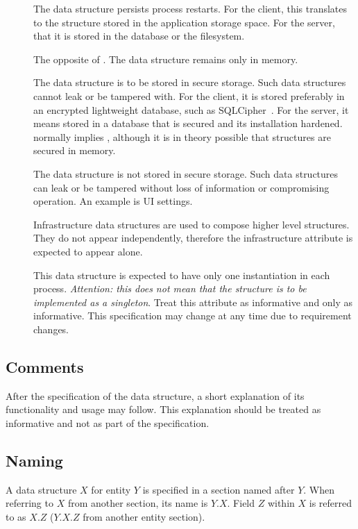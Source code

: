 \documentclass[a4paper,10pt]{article}
\begin{document}
\begin{description}
 \item[\persistent] The data structure persists process restarts. For the client, this translates to the structure stored in the application storage space. For the server, that it 
is stored in the database or the filesystem.
 \item[\ephemeral] The opposite of \persistent. The data structure remains only in memory.
 \item[\secure] The data structure is to be stored in secure storage. Such data structures cannot leak or be tampered with. For the client, it is stored preferably in an encrypted 
lightweight database, such as SQLCipher~\cite{sql_cipher}. For the server, it means stored in a database that is secured and its installation hardened. \secure{} normally implies 
\persistent, although it is in theory possible that \ephemeral{} structures are secured in memory.
 \item[\unsecure] The data structure is not stored in secure storage. Such data structures can leak or be tampered without loss of information or compromising operation. An example 
is UI settings.
 \item[\infrastructure] Infrastructure data structures are used to compose higher level structures. They do not appear independently, therefore the infrastructure attribute is 
expected to appear alone.
 \item[\unique] This data structure is expected to have only one instantiation in each process. {\em Attention: this does not mean that the structure is to be implemented as a 
singleton}. Treat this attribute as informative and only as informative. This specification may change at any time due to requirement changes.
\end{description}

\subsection{Comments}
After the specification of the data structure, a short explanation of its functionality and usage may follow. This explanation should be treated as informative and not as part of 
the specification.

\subsection{Naming}
A data structure $X$ for entity $Y$ is specified in a section named after $Y$. When referring to $X$ from another section, its name is $Y.X$. Field $Z$ within $X$ is referred to 
as $X.Z$ ($Y.X.Z$ from another entity section).
\end{document}
